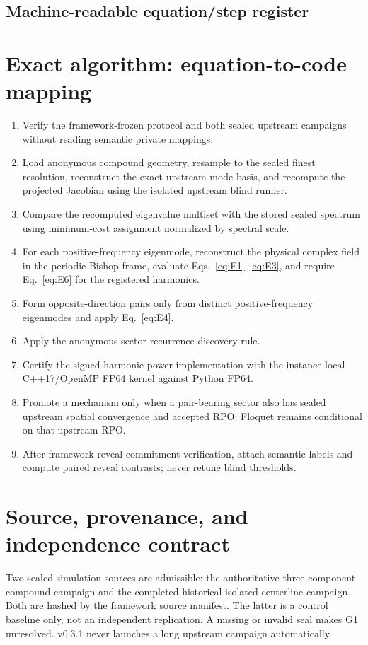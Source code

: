 \documentclass[11pt,a4paper]{article}
\begin{document}
\subsection{Machine-readable equation/step register}

\section{Exact algorithm: equation-to-code mapping}
\begin{enumerate}[label=S\arabic*.]
\item Verify the framework-frozen protocol and both sealed upstream campaigns without reading semantic private mappings.
\item Load anonymous compound geometry, resample to the sealed finest resolution, reconstruct the exact upstream mode basis, and recompute the projected Jacobian using the isolated upstream blind runner.
\item Compare the recomputed eigenvalue multiset with the stored sealed spectrum using minimum-cost assignment normalized by spectral scale.
\item For each positive-frequency eigenmode, reconstruct the physical complex field in the periodic Bishop frame, evaluate Eqs.~\eqref{eq:E1}--\eqref{eq:E3}, and require Eq.~\eqref{eq:E6} for the registered harmonics.
\item Form opposite-direction pairs only from distinct positive-frequency eigenmodes and apply Eq.~\eqref{eq:E4}.
\item Apply the anonymous sector-recurrence discovery rule.
\item Certify the signed-harmonic power implementation with the instance-local C++17/OpenMP FP64 kernel against Python FP64.
\item Promote a mechanism only when a pair-bearing sector also has sealed upstream spatial convergence and accepted RPO; Floquet remains conditional on that upstream RPO.
\item After framework reveal commitment verification, attach semantic labels and compute paired reveal contrasts; never retune blind thresholds.
\end{enumerate}

\section{Source, provenance, and independence contract}
Two sealed simulation sources are admissible: the authoritative three-component compound campaign and the completed historical isolated-centerline campaign. Both are hashed by the framework source manifest. The latter is a control baseline only, not an independent replication. A missing or invalid seal makes G1 unresolved. v0.3.1 never launches a long upstream campaign automatically.
\end{document}
